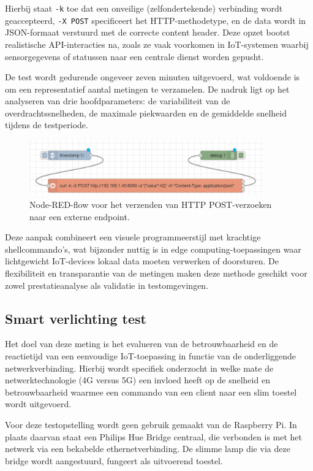 Hierbij staat \texttt{-k} toe dat een onveilige (zelfondertekende) verbinding wordt geaccepteerd, \texttt{-X POST} specificeert het HTTP-methodetype, en de data wordt in JSON-formaat verstuurd met de correcte content header. Deze opzet bootst realistische API-interacties na, zoals ze vaak voorkomen in IoT-systemen waarbij sensorgegevens of statussen naar een centrale dienst worden gepusht.

De test wordt gedurende ongeveer zeven minuten uitgevoerd, wat voldoende is om een representatief aantal metingen te verzamelen. De nadruk ligt op het analyseren van drie hoofdparameters: de variabiliteit van de overdrachtssnelheden, de maximale piekwaarden en de gemiddelde snelheid tijdens de testperiode. 

\begin{figure}[h]
    \centering
    \includegraphics[width=0.9\textwidth]{../graphics/node-red_flow.png}
    \caption{Node-RED-flow voor het verzenden van HTTP POST-verzoeken naar een externe endpoint.}
    \label{fig:nodered-flow}
\end{figure}

Deze aanpak combineert een visuele programmeerstijl met krachtige shellcommando’s, wat bijzonder nuttig is in edge computing-toepassingen waar lichtgewicht IoT-devices lokaal data moeten verwerken of doorsturen. De flexibiliteit en transparantie van de metingen maken deze methode geschikt voor zowel prestatieanalyse als validatie in testomgevingen.


\subsection{Smart verlichting test}
Het doel van deze meting is het evalueren van de betrouwbaarheid en de reactietijd van een eenvoudige IoT-toepassing in functie van de onderliggende netwerkverbinding. Hierbij wordt specifiek onderzocht in welke mate de netwerktechnologie (4G versus 5G) een invloed heeft op de snelheid en betrouwbaarheid waarmee een commando van een client naar een slim toestel wordt uitgevoerd.

Voor deze testopstelling wordt geen gebruik gemaakt van de Raspberry Pi. In plaats daarvan staat een Philips Hue Bridge centraal, die verbonden is met het netwerk via een bekabelde ethernetverbinding. De slimme lamp die via deze bridge wordt aangestuurd, fungeert als uitvoerend toestel. 

